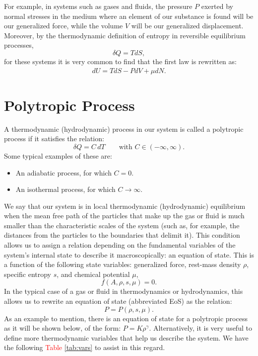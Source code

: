 \documentclass[12pt]{report}
\newcommand\red[1]{\textcolor{red}{#1}}
\begin{document}
	For example, in systems such as gases and fluids, the pressure $P$ exerted by normal stresses in the medium where an element of our substance is found will be our generalized force, while the volume $V$ will be our generalized displacement. Moreover, by the thermodynamic definition of entropy in reversible equilibrium processes,
	\begin{equation}
		\delta Q=TdS,
	\end{equation}
	for these systems it is very common to find that the first law is rewritten as:
	\begin{align}
		dU = TdS-PdV+\mu dN.
	\end{align}
	\section{Polytropic Process}
	A thermodynamic (hydrodynamic) process in our system is called a polytropic process if it satisfies the relation:
	\begin{equation}
		\delta Q=  C \,dT\qquad \text{with }C\in(-\infty,\infty).
	\end{equation}
	Some typical examples of these are:
	\begin{itemize}
		\item An adiabatic process, for which $C=0$.
		\item An isothermal process, for which $C\to\infty$.
	\end{itemize}
	We say that our system is in local thermodynamic (hydrodynamic) equilibrium when the mean free path of the particles that make up the gas or fluid is much smaller than the characteristic scales of the system (such as, for example, the distances from the particles to the boundaries that delimit it). This condition allows us to assign a relation depending on the fundamental variables of the system’s internal state to describe it macroscopically: an equation of state. This is a function of the following state variables: generalized force, rest-mass density $\rho$, specific entropy $s$, and chemical potential $\mu$,
	\begin{equation}
		f(A,\rho,s,\mu)=0.
	\end{equation}
	In the typical case of a gas or fluid in thermodynamics or hydrodynamics, this allows us to rewrite an equation of state (abbreviated EoS) as the relation:
	\begin{equation}
		P=P(\rho,s,\mu).
	\end{equation}
	As an example to mention, there is an equation of state for a polytropic process as it will be shown below, of the form: $P=K\rho^\gamma$. Alternatively, it is very useful to define more thermodynamic variables that help us describe the system. We have the following \red{Table \ref{tab:vars}} to assist in this regard.
\end{document}
